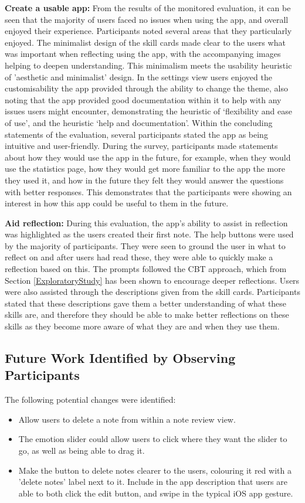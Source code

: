\documentclass{l4proj}
\begin{document}
\textbf{Create a usable app:} From the results of the monitored evaluation, it can be seen that the majority of users faced no issues when using the app, and overall enjoyed their experience. Participants noted several areas that they particularly enjoyed. The minimalist design of the skill cards made clear to the users what was important when reflecting using the app, with the accompanying images helping to deepen understanding. This minimalism meets the usability heuristic of 'aesthetic and minimalist' design. In the settings view users enjoyed the customisability the app provided through the ability to change the theme, also noting that the app provided good documentation within it to help with any issues users might encounter, demonstrating the heuristic of ‘flexibility and ease of use’, and the heuristic ‘help and documentation’. Within the concluding statements of the evaluation, several participants stated the app as being intuitive and user-friendly. During the survey, participants made statements about how they would use the app in the future, for example, when they would use the statistics page, how they would get more familiar to the app the more they used it, and how in the future they felt they would answer the questions with better responses. This demonstrates that the participants were showing an interest in how this app could be useful to them in the future.

\textbf{Aid reflection:} During this evaluation, the app's ability to assist in reflection was highlighted as the users created their first note. The help buttons were used by the majority of participants. They were seen to ground the user in what to reflect on and after users had read these, they were able to quickly make a reflection based on this. The prompts followed the CBT approach, which from Section \ref{ExploratoryStudy} has been shown to encourage deeper reflections. Users were also assisted through the descriptions given from the skill cards. Participants stated that these descriptions gave them a better understanding of what these skills are, and therefore they should be able to make better reflections on these skills as they become more aware of what they are and when they use them.

\subsection{Future Work Identified by Observing Participants}

The following potential changes were identified:
\begin{itemize}
    \item Allow users to delete a note from within a note review view.
    \item The emotion slider could allow users to click where they want the slider to go, as well as being able to drag it.
    \item Make the button to delete notes clearer to the users, colouring it red with a 'delete notes' label next to it. Include in the app description that users are able to both click the edit button, and swipe in the typical iOS app gesture.
\end{itemize}
\end{document}
